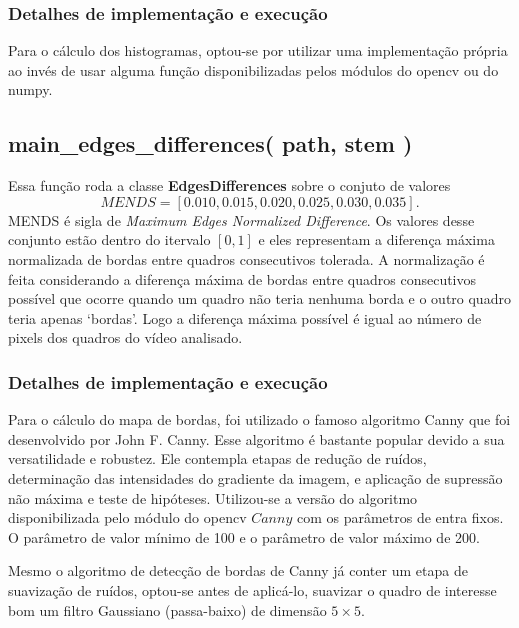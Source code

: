 \documentclass{article}
\begin{document}
\subsubsection{Detalhes de implementação e execução}
Para o cálculo dos histogramas, optou-se por utilizar uma implementação própria ao invés de usar alguma função disponibilizadas pelos módulos do opencv ou do numpy.


%
\subsection{main\_edges\_differences( path, stem )}
Essa função roda a classe \textbf{EdgesDifferences} sobre o conjuto de valores
\[
    MENDS = [0.010, 0.015, 0.020, 0.025, 0.030, 0.035].
\]
MENDS é sigla de \textit{Maximum Edges Normalized Difference}. Os valores desse conjunto estão dentro do itervalo $[0,1]$ e eles representam a diferença máxima normalizada de bordas entre quadros consecutivos tolerada. A normalização é feita considerando a diferença máxima de bordas entre quadros consecutivos possível que ocorre quando um quadro não teria nenhuma borda e o outro quadro teria apenas `bordas'. Logo a diferença máxima possível é igual ao número de pixels dos quadros do vídeo analisado.


%
\subsubsection{Detalhes de implementação e execução}
Para o cálculo do mapa de bordas, foi utilizado o famoso algoritmo Canny que foi desenvolvido por John F. Canny. Esse algoritmo é bastante popular devido a sua versatilidade e robustez. Ele contempla etapas de redução de ruídos, determinação das intensidades do gradiente da imagem, e aplicação de supressão não máxima e teste de hipóteses. Utilizou-se a versão do algoritmo disponibilizada pelo módulo do opencv $Canny$ com os parâmetros de entra fixos. O parâmetro de valor mínimo de 100 e o parâmetro de valor máximo de 200. 

Mesmo o algoritmo de detecção de bordas de Canny já conter um etapa de suavização de ruídos, optou-se antes de aplicá-lo, suavizar o quadro de interesse bom um filtro Gaussiano (passa-baixo) de dimensão $5\times5$.
\end{document}
